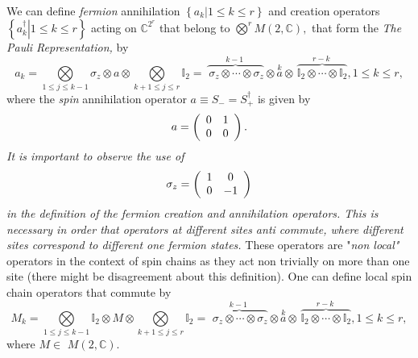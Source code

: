 \documentclass[aps,preprint]{revtex4}%
\begin{document}
We can define \emph{fermion} annihilation $\left\{  \left.  a_{k}\right\vert
1\leq k\leq r\right\}  $ and creation operators $\left\{  \left.
a_{k}^{\dagger}\right\vert 1\leq k\leq r\right\}  $ acting on $\mathbb{C}%
^{2^{r}}$ that belong to $%
{\displaystyle\bigotimes\limits^{r}}
M\left(  2,\mathbb{C}\right)  ,$ that form the \emph{The Pauli Representation,
}by
\begin{equation}
a_{k}=%
{\displaystyle\bigotimes\limits_{1\leq j\leq k-1}}
\mathbb{\sigma}_{z}\otimes a\otimes%
{\displaystyle\bigotimes\limits_{k+1\leq j\leq r}}
\mathbb{I}_{2}=\overset{k-1}{\,\overbrace{\,\mathbb{\sigma}_{z}\otimes
\cdots\otimes\mathbb{\sigma}_{z}}}\otimes\overset{k}{a}\otimes
\overset{r-k}{\,\overbrace{\mathbb{I}_{2}\otimes\cdots\otimes\mathbb{I}_{2}}%
},1\leq k\leq r,\nonumber
\end{equation}
where the \emph{spin }annihilation operator $a\equiv S_{-}=S_{+}^{\dagger}$ is
given by
\begin{equation}
a=\left(
\begin{array}
[c]{cc}%
0 & 1\\
0 & 0
\end{array}
\right)  .
\end{equation}
\emph{It is important to observe the use of }%
\begin{equation}
\mathbb{\sigma}_{z}=\left(
\begin{array}
[c]{cc}%
1 & 0\\
0 & -1
\end{array}
\right)
\end{equation}
\emph{ in the definition of the fermion creation and annihilation operators.
This is necessary in order that operators at different sites anti commute,
where different sites correspond to different one fermion states.} These
operators are "\emph{non local"} operators in the context of spin chains as
they act non trivially on more than one site (there might be disagreement
about this definition). One can define local spin chain operators that commute
by
\begin{equation}
M_{k}=%
{\displaystyle\bigotimes\limits_{1\leq j\leq k-1}}
\mathbb{I}_{2}\otimes M\otimes%
{\displaystyle\bigotimes\limits_{k+1\leq j\leq r}}
\mathbb{I}_{2}=\overset{k-1}{\,\overbrace{\,\mathbb{\sigma}_{z}\otimes
\cdots\otimes\mathbb{\sigma}_{z}}}\otimes\overset{k}{a}\otimes
\overset{r-k}{\,\overbrace{\mathbb{I}_{2}\otimes\cdots\otimes\mathbb{I}_{2}}%
},1\leq k\leq r,\nonumber
\end{equation}
where $M\in$ $M\left(  2,\mathbb{C}\right)  .$
\end{document}
